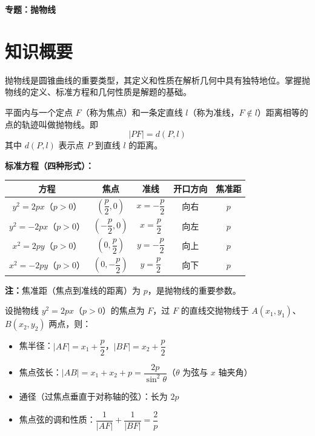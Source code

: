 \documentclass[11pt]{ctexrep}
\begin{document}
\begin{center}
    {\LARGE\bfseries 专题：抛物线}
\end{center}

\section*{知识概要}

抛物线是圆锥曲线的重要类型，其定义和性质在解析几何中具有独特地位。掌握抛物线的定义、标准方程和几何性质是解题的基础。

\begin{definition}[抛物线的定义]
    平面内与一个定点 $F$（称为焦点）和一条定直线 $l$（称为准线，$F \notin l$）距离相等的点的轨迹叫做抛物线。即
    \[
        |PF| = d(P, l)
    \]
    其中 $d(P, l)$ 表示点 $P$ 到直线 $l$ 的距离。
\end{definition}

\begin{property}[标准方程与几何性质]
    \textbf{标准方程（四种形式）：}
    \begin{center}
    \begin{tabular}{|c|c|c|c|c|}
        \hline
        方程 & 焦点 & 准线 & 开口方向 & 焦准距 \\
        \hline
        $y^2 = 2px$（$p > 0$） & $\left(\dfrac{p}{2}, 0\right)$ & $x = -\dfrac{p}{2}$ & 向右 & $p$ \\
        \hline
        $y^2 = -2px$（$p > 0$） & $\left(-\dfrac{p}{2}, 0\right)$ & $x = \dfrac{p}{2}$ & 向左 & $p$ \\
        \hline
        $x^2 = 2py$（$p > 0$） & $\left(0, \dfrac{p}{2}\right)$ & $y = -\dfrac{p}{2}$ & 向上 & $p$ \\
        \hline
        $x^2 = -2py$（$p > 0$） & $\left(0, -\dfrac{p}{2}\right)$ & $y = \dfrac{p}{2}$ & 向下 & $p$ \\
        \hline
    \end{tabular}
    \end{center}
    
    \textbf{注：}焦准距（焦点到准线的距离）为 $p$，是抛物线的重要参数。
\end{property}

\begin{property}[焦点弦性质]
    设抛物线 $y^2 = 2px$（$p > 0$）的焦点为 $F$，过 $F$ 的直线交抛物线于 $A(x_1, y_1)$、$B(x_2, y_2)$ 两点，则：
    \begin{itemize}
        \item 焦半径：$|AF| = x_1 + \dfrac{p}{2}$，$|BF| = x_2 + \dfrac{p}{2}$
        \item 焦点弦长：$|AB| = x_1 + x_2 + p = \dfrac{2p}{\sin^2\theta}$（$\theta$ 为弦与 $x$ 轴夹角）
        \item 通径（过焦点垂直于对称轴的弦）：长为 $2p$
        \item 焦点弦的调和性质：$\dfrac{1}{|AF|} + \dfrac{1}{|BF|} = \dfrac{2}{p}$
    \end{itemize}
\end{property}
\end{document}
